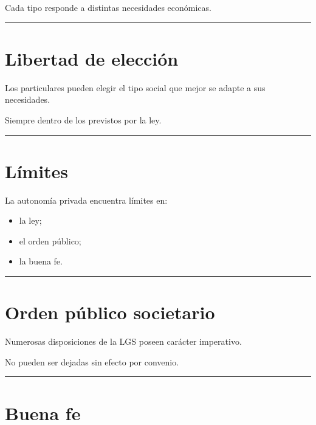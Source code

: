 \documentclass[
  spanish,
  letterpaper,
  DIV=11,
  numbers=noendperiod]{scrartcl}
\providecommand{\tightlist}{%
  \setlength{\itemsep}{0pt}\setlength{\parskip}{0pt}}
\begin{document}
Cada tipo responde a distintas necesidades económicas.

\begin{center}\rule{0.5\linewidth}{0.5pt}\end{center}

\section{Libertad de elección}\label{libertad-de-elecciuxf3n}

Los particulares pueden elegir el tipo social que mejor se adapte a sus
necesidades.

Siempre dentro de los previstos por la ley.

\begin{center}\rule{0.5\linewidth}{0.5pt}\end{center}

\section{Límites}\label{luxedmites}

La autonomía privada encuentra límites en:

\begin{itemize}
\tightlist
\item
  la ley;
\item
  el orden público;
\item
  la buena fe.
\end{itemize}

\begin{center}\rule{0.5\linewidth}{0.5pt}\end{center}

\section{Orden público societario}\label{orden-puxfablico-societario}

Numerosas disposiciones de la LGS poseen carácter imperativo.

No pueden ser dejadas sin efecto por convenio.

\begin{center}\rule{0.5\linewidth}{0.5pt}\end{center}

\section{Buena fe}\label{buena-fe-1}
\end{document}
